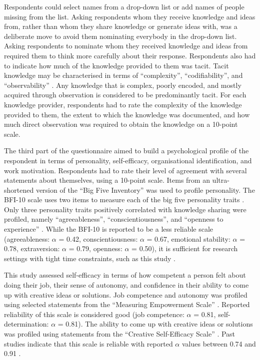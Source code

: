 Respondents could select names from a drop-down list or add names of people missing from the list. Asking respondents whom they receive knowledge and ideas from, rather than whom they share knowledge or generate ideas with, was a deliberate move to avoid them nominating everybody in the drop\hyp{}down list. Asking respondents to nominate whom they received knowledge and ideas from required them to think more carefully about their response. Respondents also had to indicate how much of the knowledge provided to them was tacit. Tacit knowledge may be characterised in terms of \enquote{complexity}, \enquote{codifiability}, and \enquote{observability} \citep{winter1987knowledge,zander1995knowledge,cavusgil2003tacit}. Any knowledge that is complex, poorly encoded, and mostly acquired through observation is considered to be predominantly tacit. For each knowledge provider, respondents had to rate the complexity of the knowledge provided to them, the extent to which the knowledge was documented, and how much direct observation was required to obtain the knowledge on a 10\hyp{}point scale. \medskip

The third part of the questionnaire aimed to build a psychological profile of the respondent in terms of personality, self-efficacy, organisational identification, and work motivation. Respondents had to rate their level of agreement with several statements about themselves, using a 10-point scale. Items from an ultra-shortened version of the \enquote{Big Five Inventory} was used to profile personality. The BFI-10 scale uses two items to measure each of the big five personality traits \citep{rammstedt2007measuring}. Only three personality traits positively correlated with knowledge sharing were profiled, namely \enquote{agreeableness}, \enquote{conscientiousness}, and \enquote{openness to experience} \citep{matzler2008personality,matzler2011personality}. While the BFI-10 is reported to be a less reliable scale (agreeableness: $\alpha$ = 0.42, conscientiousness: $\alpha$ = 0.67, emotional stability: $\alpha$ = 0.78, extraversion: $\alpha$ = 0.79, openness: $\alpha$ = 0.50), it is sufficient for research settings with tight time constraints, such as this study \citep{rammstedt2007measuring}. \medskip

This study assessed self-efficacy in terms of how competent a person felt about doing their job, their sense of autonomy, and confidence in their ability to come up with creative ideas or solutions. Job competence and autonomy was profiled using selected statements from the \enquote{Measuring Empowerment Scale} \citep{spreitzer1995psychological}. Reported reliability of this scale is considered good (job competence: $\alpha$ = 0.81, self-determination: $\alpha$ = 0.81). The ability to come up with creative ideas or solutions was profiled using statements from the \enquote{Creative Self\hyp{}Efficacy Scale} \citep{tierney2002creative}. Past studies indicate that this scale is reliable with reported $\alpha$ values between 0.74 and 0.91 \citep{tierney2002creative,gong2009employee,tierney2011creative,mittal2015transformational}. \medskip

